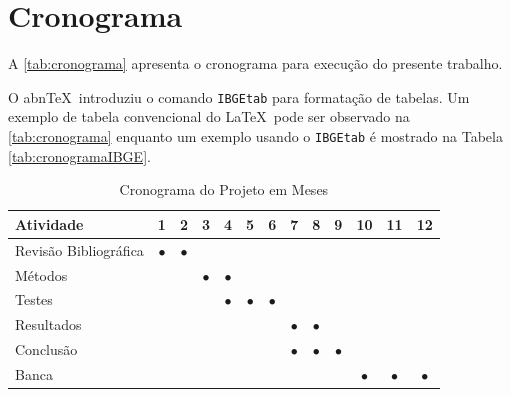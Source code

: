 \chapter{Cronograma}\label{sec:cronograma}
A \autoref{tab:cronograma} apresenta o cronograma para execução do presente trabalho.

O abn\TeX\ introduziu o comando \texttt{IBGEtab} para formatação de tabelas. Um exemplo de tabela convencional do \LaTeX\ pode ser observado na \autoref{tab:cronograma} enquanto um exemplo usando o \texttt{IBGEtab} é mostrado na Tabela \ref{tab:cronogramaIBGE}.

\begin{table}[htbp]
  \centering
    \caption[Cronograma Normal]{Cronograma do Projeto em Meses}
    \label{tab:cronograma}
    \begin{tabular}{lcccccccccccc} %
    \toprule
    \textbf{Atividade} & \textbf{1} & \textbf{2} & \textbf{3} & \textbf{4} & \textbf{5} & \textbf{6} & \textbf{7} & \textbf{8} & \textbf{9} & \textbf{10} & \textbf{11} & \textbf{12} \\
    \midrule
        Revisão Bibliográfica & $\bullet$ & $\bullet$ & & & & & & & & & & \\
        Métodos & & & $\bullet$ & $\bullet$ & & & & & & & & \\
        Testes & & & & $\bullet$ & $\bullet$ & $\bullet$ & & & & & & \\
        Resultados & & & & & & & $\bullet$ & $\bullet$ & & & & \\
        Conclusão & & & & & & & $\bullet$ & $\bullet$ & $\bullet$ & & & \\
        Banca & & & & & & &&&& $\bullet$ & $\bullet$ & $\bullet$ \\
    \bottomrule
    \end{tabular}%
\end{table}%

